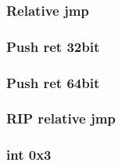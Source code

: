 \subsubsection{Relative jmp}
\subsubsection{Push ret 32bit}
\subsubsection{Push ret 64bit}
\subsubsection{RIP relative jmp}
\subsubsection{int 0x3}

